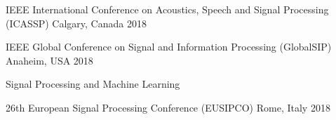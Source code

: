

\begin{cventries}
            {IEEE International Conference on Acoustics, Speech and Signal Processing (ICASSP)} %
            {Calgary, Canada} %
            {2018} %
            { %
            }

            {IEEE Global Conference on Signal and Information Processing (GlobalSIP)} %
            {Anaheim, USA} %
            {2018} %
            {
                \begin{cvitems} %
                    \item {Signal Processing and Machine Learning}
                    \item {\lorem}
                \end{cvitems}
            }
            
            {26th European Signal Processing Conference (EUSIPCO)} %
            {Rome, Italy} %
            {2018} %
            { %
            }
\end{cventries}
